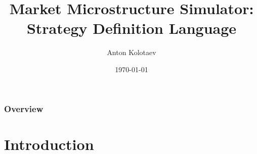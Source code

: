 \documentclass{beamer}
\title[FiQuant Market Simulator]{Market Microstructure Simulator: Strategy Definition Language} %
\author{Anton Kolotaev} %
\institute[ECP] %
{
Chair of Quantitative Finance, \'{E}cole Centrale Paris \\ %
\medskip
\textit{anton.kolotaev@gmail.com} %
}
\date{\today} %
\begin{document}
\begin{frame}
\titlepage %
\end{frame}

\begin{frame}
\frametitle{Overview} %
\tableofcontents %
\end{frame}


\section{Introduction}
\end{document}
